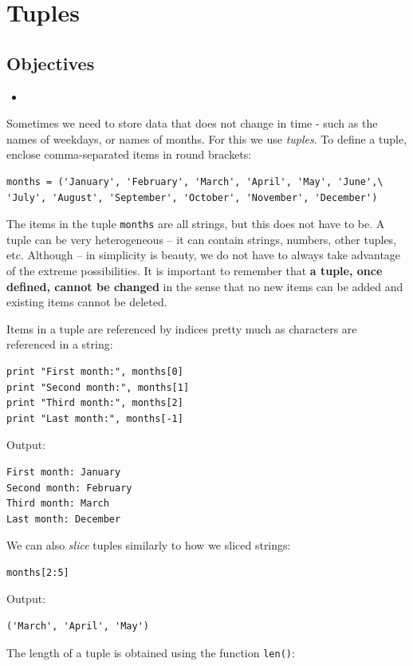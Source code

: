 \section{Tuples}

\subsection{Objectives}

\begin{itemize}
\item
\end{itemize}
Sometimes we need to store data that does not change in time - such as 
the names of weekdays, or names of months. For this we use {\em tuples}.
To define a tuple, enclose comma-separated items in round brackets: 

\begin{verbatim}
months = ('January', 'February', 'March', 'April', 'May', 'June',\
'July', 'August', 'September', 'October', 'November', 'December')
\end{verbatim}
The items in the tuple {\tt months} are all strings, but this does not 
have to be. A tuple can be very heterogeneous -- it can contain strings,
numbers, other tuples, etc. Although -- in simplicity is beauty, we
do not have to always take advantage of the extreme possibilities.
It is important to remember that {\bf a tuple, once defined, cannot 
be changed} in the sense that no new items can be added and existing 
items cannot be deleted.

Items in a tuple are referenced by indices pretty much as characters 
are referenced in a string:

\begin{verbatim}
print "First month:", months[0]
print "Second month:", months[1]
print "Third month:", months[2]
print "Last month:", months[-1]
\end{verbatim}
Output:

\begin{verbatim}
First month: January
Second month: February
Third month: March
Last month: December
\end{verbatim}
We can also {\em slice} tuples similarly to how we sliced strings:

\begin{verbatim}
months[2:5]
\end{verbatim}
Output:

\begin{verbatim}
('March', 'April', 'May')
\end{verbatim}
The length of a tuple is obtained using the function {\tt len()}:

